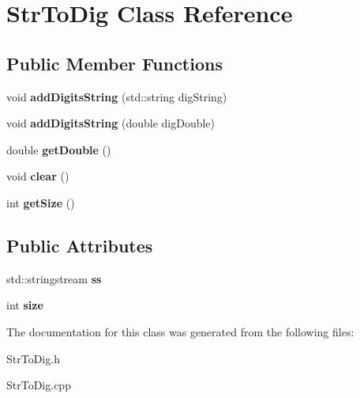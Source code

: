 \hypertarget{class_str_to_dig}{}\section{Str\+To\+Dig Class Reference}
\label{class_str_to_dig}
\subsection*{Public Member Functions}
\begin{DoxyCompactItemize}
\item 
\hypertarget{class_str_to_dig_a77478d5ac1f4dca2c1cbecda407fbf56}{}void {\bfseries add\+Digits\+String} (std\+::string dig\+String)\label{class_str_to_dig_a77478d5ac1f4dca2c1cbecda407fbf56}

\item 
\hypertarget{class_str_to_dig_af20b09f86e90d18f83c4c87e6f34cc1e}{}void {\bfseries add\+Digits\+String} (double dig\+Double)\label{class_str_to_dig_af20b09f86e90d18f83c4c87e6f34cc1e}

\item 
\hypertarget{class_str_to_dig_afbb98b1ef5730992ec6fcacf024f575d}{}double {\bfseries get\+Double} ()\label{class_str_to_dig_afbb98b1ef5730992ec6fcacf024f575d}

\item 
\hypertarget{class_str_to_dig_a5a53d889ec55a4be20a6007d0e9df2b6}{}void {\bfseries clear} ()\label{class_str_to_dig_a5a53d889ec55a4be20a6007d0e9df2b6}

\item 
\hypertarget{class_str_to_dig_a3a913de6f12f2773283eaa18c66d5749}{}int {\bfseries get\+Size} ()\label{class_str_to_dig_a3a913de6f12f2773283eaa18c66d5749}

\end{DoxyCompactItemize}
\subsection*{Public Attributes}
\begin{DoxyCompactItemize}
\item 
\hypertarget{class_str_to_dig_aad04956b7e82a5747c5bff326847c361}{}std\+::stringstream {\bfseries ss}\label{class_str_to_dig_aad04956b7e82a5747c5bff326847c361}

\item 
\hypertarget{class_str_to_dig_a8a3a32b98e04f6e418c1218c97b9cf54}{}int {\bfseries size}\label{class_str_to_dig_a8a3a32b98e04f6e418c1218c97b9cf54}

\end{DoxyCompactItemize}


The documentation for this class was generated from the following files\+:\begin{DoxyCompactItemize}
\item 
Str\+To\+Dig.\+h\item 
Str\+To\+Dig.\+cpp\end{DoxyCompactItemize}

